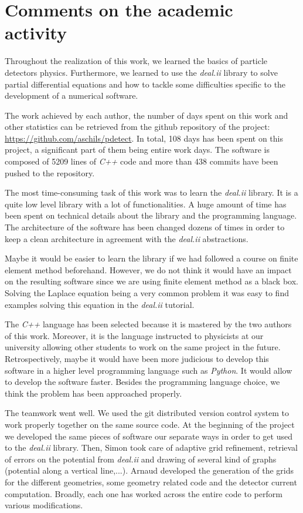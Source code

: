 \documentclass[11pt]{article}
\begin{document}
		\section{Comments on the academic activity} \label{App:academic}

		Throughout the realization of this work, we learned the	basics of
		particle detectors physics. Furthermore, we learned to use the \textit{deal.ii}
		library to solve partial differential equations and how to tackle some
		difficulties specific to the development of a numerical software.

		The work achieved by each author, the number of days spent on this work
		and other statistics can be retrieved from the github repository of the
		project: \url{https://github.com/aschils/pdetect}. In total, 108 days
		has been spent on this project, a significant part of them being entire
		work days. The software is composed of 5209 lines of \textit{C++} code and
		more than 438 commits have been pushed to the repository.

		The most time-consuming task of this work was to learn the \textit{deal.ii}
		library. It is a quite low level library with a lot of functionalities.
		A huge amount of time has been spent on technical details about the
		library and the programming language. The architecture of the software
		has been changed dozens of times in order to keep a clean architecture in
		agreement with the \textit{deal.ii} abstractions.

		Maybe it would be easier to learn the library if we had followed
		a course on finite element method beforehand. However, we do not think
		it would have an impact on the resulting software since we are using
		finite element method as a black box. Solving the Laplace equation being
		a very common problem it was easy to find examples solving this equation
		in the \textit{deal.ii} tutorial.

		The \textit{C++} language has been selected because it is mastered by the two authors of this
		work. Moreover, it is the language instructed to physicists at our university
		allowing other students to work on the same project in the future.
		Retrospectively, maybe it would have been more judicious to develop
		this software in a higher level programming language such as \textit{Python}.
		It would allow to develop the software faster. Besides the programming
		language choice, we think the problem has been approached properly.

		The teamwork went well. We used the git distributed version control system
		to work properly together on the same source code. At the beginning of the
		project we developed the same pieces of software our separate ways in order
		to get used	to the \textit{deal.ii} library. Then, Simon took care of
		adaptive grid refinement, retrieval of errors on the potential from
		\textit{deal.ii} and drawing of several kind of graphs (potential
		along a vertical line,...). Arnaud developed the generation of the grids
		for the different geometries, some geometry related code and the detector
		current computation. Broadly, each one has worked across the entire code
		to perform various modifications.

\newpage




\end{document}
